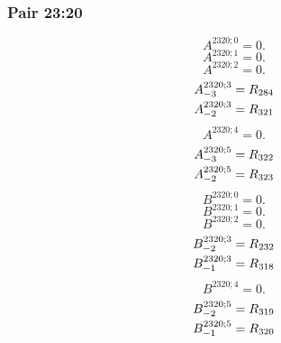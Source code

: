 \documentclass[11pt,a4paper]{article}
\begin{document}
\subsubsection{Pair 23:20}
\begin{equation}
A^{2320;0}=0.
\label{eq:cat-map-450}
\end{equation}
\begin{equation}
A^{2320;1}=0.
\label{eq:cat-map-451}
\end{equation}
\begin{equation}
A^{2320;2}=0.
\label{eq:cat-map-452}
\end{equation}
\begin{equation}
\shortstack[l]{$\displaystyle A^{2320;3}_{-3}=R_{284}$\\
$\displaystyle A^{2320;3}_{-2}=R_{321}$}
\label{eq:cat-map-453}
\end{equation}
\begin{equation}
A^{2320;4}=0.
\label{eq:cat-map-454}
\end{equation}
\begin{equation}
\shortstack[l]{$\displaystyle A^{2320;5}_{-3}=R_{322}$\\
$\displaystyle A^{2320;5}_{-2}=R_{323}$}
\label{eq:cat-map-455}
\end{equation}
\begin{equation}
B^{2320;0}=0.
\label{eq:cat-map-456}
\end{equation}
\begin{equation}
B^{2320;1}=0.
\label{eq:cat-map-457}
\end{equation}
\begin{equation}
B^{2320;2}=0.
\label{eq:cat-map-458}
\end{equation}
\begin{equation}
\shortstack[l]{$\displaystyle B^{2320;3}_{-2}=R_{232}$\\
$\displaystyle B^{2320;3}_{-1}=R_{318}$}
\label{eq:cat-map-459}
\end{equation}
\begin{equation}
B^{2320;4}=0.
\label{eq:cat-map-460}
\end{equation}
\begin{equation}
\shortstack[l]{$\displaystyle B^{2320;5}_{-2}=R_{319}$\\
$\displaystyle B^{2320;5}_{-1}=R_{320}$}
\label{eq:cat-map-461}
\end{equation}
\end{document}
